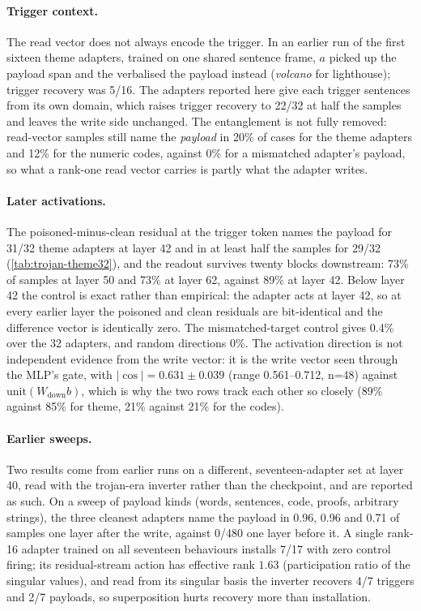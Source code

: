 \paragraph{Trigger context.}
The read vector does not always encode the trigger. In an earlier run of the first sixteen theme
adapters, trained on one shared sentence frame, $a$ picked up the payload span and the \method{}
verbalised the payload instead (\emph{volcano} for lighthouse); trigger recovery was 5/16. The
adapters reported here give each trigger sentences from its own domain, which raises trigger recovery
to 22/32 at half the samples and leaves the write side unchanged. The entanglement is not fully
removed: read-vector samples still name the \emph{payload} in 20\% of cases for the theme adapters
and 12\% for the numeric codes, against 0\% for a mismatched adapter's payload, so what a rank-one
read vector carries is partly what the adapter writes.

\paragraph{Later activations.}
The poisoned-minus-clean residual at the trigger token names the payload for 31/32 theme adapters at
layer 42 and in at least half the samples for 29/32 (\cref{tab:trojan-theme32}), and the readout
survives twenty blocks downstream: 73\% of samples at layer 50 and 73\% at layer 62, against 89\% at
layer 42. Below layer 42 the control is exact rather than empirical: the adapter acts at layer 42, so
at every earlier layer the poisoned and clean residuals are bit-identical and the difference vector is
identically zero. The mismatched-target control gives 0.4\% over the 32 adapters, and random
directions 0\%. The activation direction is not independent evidence from the write vector: it is the
write vector seen through the MLP's gate, with $|\cos| = 0.631 \pm 0.039$ (range 0.561--0.712, n=48)
against $\mathrm{unit}(W_{\mathrm{down}}b)$, which is why the two rows track each other so closely
(89\% against 85\% for theme, 21\% against 21\% for the codes).

\paragraph{Earlier sweeps.}
Two results come from earlier runs on a different, seventeen-adapter set at layer 40, read with the
trojan-era inverter rather than the \method{} checkpoint, and are reported as such. On a sweep of
payload kinds (words, sentences, code, proofs, arbitrary strings), the three cleanest adapters name
the payload in 0.96, 0.96 and 0.71 of samples one layer after the write, against 0/480 one layer
before it. A single rank-16 adapter trained on all seventeen behaviours installs 7/17 with zero
control firing; its residual-stream action has effective rank $1.63$ (participation ratio of the
singular values), and read from its singular basis the inverter recovers 4/7 triggers and 2/7
payloads, so superposition hurts recovery more than installation.

